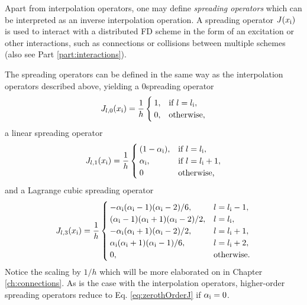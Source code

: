 Apart from interpolation operators, one may define \textit{spreading operators} which can be interpreted as an inverse interpolation operation. A spreading operator $J(x_{\text{i}})$ is used to interact with a distributed FD scheme in the form of an excitation or other interactions, such as connections or collisions between multiple schemes (also see Part \ref{part:interactions}).

The spreading operators can be defined in the same way as the interpolation operators described above, yielding a $0$\thOrder spreading operator
\begin{equation}\label{eq:zerothOrderJ}
    J_{l,0}(x_{\text{i}}) = \frac{1}{h}\begin{cases}
        1, & \text{if}\ l = l_{\text{i}},\\
        0, & \text{otherwise},
    \end{cases}
\end{equation}
a linear spreading operator
\begin{equation}\label{eq:firstOrderJ}
    J_{l,1}(x_{\text{i}}) = \frac{1}{h}\begin{cases}
        (1-\alpha_{\text{i}}), & \text{if}\ l = l_{\text{i}},\\
        \alpha_{\text{i}} , & \text{if}\ l = l_{\text{i}} + 1,\\
        0 & \text{otherwise,}
    \end{cases}
\end{equation}
and a Lagrange cubic spreading operator
\begin{equation}\label{eq:cubicJ}
    J_{l,3}(x_{\text{i}}) = \frac{1}{h}\begin{cases}
        -\alpha_{\text{i}} (\alpha_{\text{i}}-1)(\alpha_{\text{i}}-2)/6, & l = l_{\text{i}}-1,\\
        (\alpha_{\text{i}}-1)(\alpha_{\text{i}}+1)(\alpha_{\text{i}}-2)/2,  & l = l_{\text{i}},\\
        -\alpha_{\text{i}} (\alpha_{\text{i}}+1)(\alpha_{\text{i}}-2)/2, & l = l_{\text{i}} + 1,\\
        \alpha_{\text{i}} (\alpha_{\text{i}}+1)(\alpha_{\text{i}}-1)/6, & l = l_{\text{i}} + 2,\\
        0, & \text{otherwise.}
    \end{cases}
\end{equation}
Notice the scaling by $1/h$ which will be more elaborated on in Chapter \ref{ch:connections}. As is the case with the interpolation operators, higher-order spreading operators reduce to Eq. \eqref{eq:zerothOrderJ} if $\alpha_{\text{i}} = 0$.

